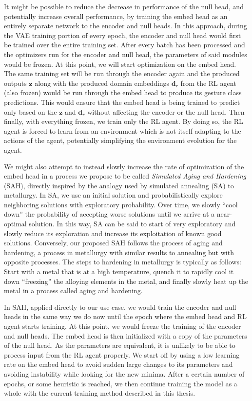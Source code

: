 It might be possible to reduce the decrease in performance of the null head, and potentially increase overall performance, by training the embed head as an entirely separate network to the encoder and null heads.
In this approach, during the VAE training portion of every epoch, the encoder and null head would first be trained over the entire training set.
After every batch has been processed and the optimizers run for the encoder and null head, the parameters of said modules would be frozen.
At this point, we will start optimization on the embed head.
The same training set will be run through the encoder again and the produced outputs $\boldsymbol{z}$ along with the produced domain embeddings $\boldsymbol{d}_r$ from the RL agent (also frozen) would be run through the embed head to produce its gesture class predictions.
This would ensure that the embed head is being trained to predict only based on the $\boldsymbol{z}$ and $\boldsymbol{d}_r$ without affecting the encoder or the null head.
Then finally, with everything frozen, we train only the RL agent.
By doing so, the RL agent is forced to learn from an environment which is not itself adapting to the actions of the agent, potentially simplifying the environment evolution for the agent.

We might also attempt to instead slowly increase the rate of optimization of the embed head in a process we propose to be called \textit{Simulated Aging and Hardening} (SAH), directly inspired by the analogy used by simulated annealing (SA) to metallurgy.
In SA, we use an initial solution and probabilistically explore neighboring solutions with exploratory probability. 
Over time, we slowly ``cool down'' the probability of accepting worse solutions until we arrive at a near-optimal solution.
In this way, SA can be said to start of very exploratory and slowly reduce its exploration and increase its exploitation of known good solutions.
Conversely, our proposed SAH follows the process of aging and hardening, a process in metallurgy with similar results to annealing but with opposite processes.
The steps to hardening in metallurgy is typically as follows: Start with a metal that is at a high temperature, quench it to rapidly cool it down ``freezing'' the alloying elements in the metal, and finally slowly heat up the metal in a process called aging and hardening.

In SAH, applied directly to our use case, we would train the encoder and null heads in the same way we do now until the epoch where the embed head and RL agent starts training.
At this point, we would freeze the training of the encoder and null heads.
The embed head is then initialized with a copy of the parameters of the null head.
As the parameters are equivalent, it is unlikely to be able to process input from the RL agent properly.
We start off by using a low learning rate on the embed head to avoid sudden large changes to its parameters and avoiding instability while looking for the new minima.
After a certain number of epochs, or some heuristic is reached, we then continue training the model as a whole with the current training method described in this thesis.
